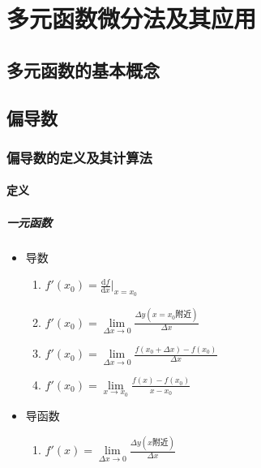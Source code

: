 \documentclass[UTF8,a4paper,12pt,scheme=chinese]{ctexbook}
\newcommand{\ud}{\mathrm{d}}
\theoremstyle{plain}
\begin{document}
	\chapter{多元函数微分法及其应用}
	\section{多元函数的基本概念}
	\section{偏导数}
	\subsection{偏导数的定义及其计算法}
	\subsubsection{定义}
	\paragraph{一元函数}
	\begin{itemize}
		\item 导数
		\begin{enumerate}
			\item $f'(x_0) = \frac{\ud f}{\ud x}\Big|_{x=x_0}$
			\item $f'(x_0)=\lim\limits_{\Delta x \rightarrow 0}\frac{\Delta y(x=x_0\mbox{附近})}{\Delta x}$
			\item $f'(x_0)=\lim\limits_{\Delta x \rightarrow 0}\frac{f(x_0+\Delta x)-f(x_0)}{\Delta x}$
			\item $f'(x_0)=\lim\limits_{ x \rightarrow x_0}\frac{f(x)-f(x_0)}{x-x_0}$
		\end{enumerate}
		\item 导函数
		\begin{enumerate}
			\item $f'(x)=\lim\limits_{\Delta x \rightarrow 0}\frac{\Delta y(x\mbox{附近})}{\Delta x}$
		\end{enumerate}
	\end{itemize}
\end{document}
